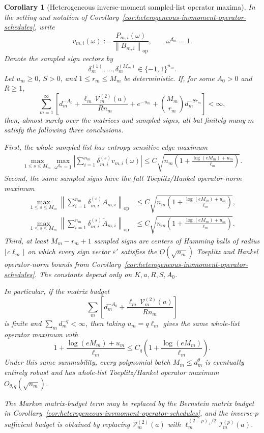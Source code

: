 \documentclass[11pt]{amsart}
\numberwithin{equation}{section}
\newtheorem{corollary}[theorem]{Corollary}
\theoremstyle{definition}
\theoremstyle{remark}
\newcommand{\op}{\mathrm{op}}
\newcommand{\norm}[1]{\left\lVert #1\right\rVert}
\newcommand{\eps}{\varepsilon}
\begin{document}
\begin{corollary}[Heterogeneous inverse-moment sampled-list operator maxima]
\label{cor:heterogeneous-invmoment-operator-batch-maxima}
In the setting and notation of
Corollary~\ref{cor:heterogeneous-invmoment-operator-schedules}, write
\[
  v_{m,i}(\omega):=
  \frac{P_{m,i}(\omega)}{\norm{B_{m,i}}_{\op}},
  \qquad \omega^{d_m}=1.
\]
Denote the sampled sign vectors by
\[
  \delta_m^{(1)},\ldots,\delta_m^{(M_m)}\in\{-1,1\}^{n_m}.
\]
Let \(u_m\ge0\), \(S>0\), and \(1\le r_m\le M_m\) be deterministic.  If, for
some \(A_0>0\) and \(R\ge1\),
\[
  \sum_{m=1}^{\infty}
  \left[
    d_m^{-A_0}
    +\frac{\ell_m\,\mathcal V_m^{(2)}(a)}{R n_m}
    +e^{-u_m}
    +\binom{M_m}{r_m}d_m^{-S r_m}
  \right]<\infty,
\]
then, almost surely over the matrices and sampled signs, all but finitely many
\(m\) satisfy the following three conclusions.

First, the whole sampled list has entropy-sensitive edge maximum
\[
\begin{aligned}
  \max_{1\le s\le M_m}\max_{\omega^{d_m}=1}
  \left|\sum_{i=1}^{n_m}\delta_{m,i}^{(s)}v_{m,i}(\omega)\right|
  \le
  C\sqrt{n_m\left(1+\frac{\log(eM_m)+u_m}{\ell_m}\right)} .
\end{aligned}
\]
Second, the same sampled signs have the full Toeplitz/Hankel operator-norm
maximum
\[
\begin{aligned}
  \max_{1\le s\le M_m}
  \left\|\sum_{i=1}^{n_m}\delta_{m,i}^{(s)}A_{m,i}\right\|_{\op}
  &\le
  C\sqrt{n_m\left(1+\frac{\log(eM_m)+u_m}{\ell_m}\right)},\\
  \max_{1\le s\le M_m}
  \left\|\sum_{i=1}^{n_m}\delta_{m,i}^{(s)}\widetilde A_{m,i}\right\|_{\op}
  &\le
  C\sqrt{n_m\left(1+\frac{\log(eM_m)+u_m}{\ell_m}\right)} .
\end{aligned}
\]
Third, at least \(M_m-r_m+1\) sampled signs are centers of Hamming balls of
radius \(\lfloor c\ell_m\rfloor\) on which every sign vector \(\eps'\)
satisfies the \(O(\sqrt{n_m})\) Toeplitz and Hankel operator-norm bounds from
Corollary~\ref{cor:heterogeneous-invmoment-operator-schedules}.  The constants
depend only on \(K,a,R,S,A_0\).

In particular, if the matrix budget
\[
  \sum_m\left[
    d_m^{-A_0}
    +\frac{\ell_m\,\mathcal V_m^{(2)}(a)}{R n_m}
  \right]
\]
is finite and \(\sum_m d_m^{-q}<\infty\), then taking
\(u_m=q\ell_m\) gives the same whole-list operator maximum with
\[
  1+\frac{\log(eM_m)+u_m}{\ell_m}
  \le C_q\left(1+\frac{\log(eM_m)}{\ell_m}\right).
\]
Under this same summability, every polynomial batch \(M_m\le d_m^\theta\) is
eventually entirely robust and has whole-list Toeplitz/Hankel operator maximum
\(O_{\theta,q}(\sqrt{n_m})\).

The Markov matrix-budget term may be replaced by the Bernstein matrix budget in
Corollary~\ref{cor:heterogeneous-invmoment-operator-schedules}, and the
inverse-\(p\) sufficient budget is obtained by replacing
\(\mathcal V_m^{(2)}(a)\) with
\(\ell_m^{(2-p)_+/2}\mathcal I_m^{(p)}(a)\).
\end{corollary}
\end{document}

